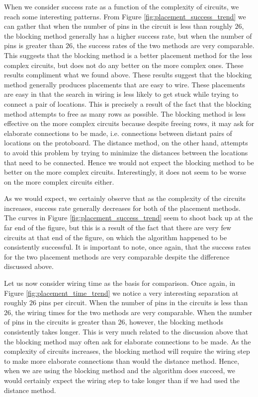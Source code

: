 When we consider success rate as a function of the complexity of circuits, we
reach some interesting patterns. From Figure \ref{fig:placement_success_trend} we
can gather that when the number of pins in the circuit is less than roughly $26$,
the blocking method generally has a higher success rate, but when the number of
pins is greater than $26$, the success rates of the two methods are very
comparable. This suggests that the blocking method is a better placement method
for the less complex circuits, but does not do any better on the more
complex ones. These results compliment what we found above. These results
suggest that the blocking method generally produces placements that are easy to
wire. These placements are easy in that the search in wiring is less likely to
get stuck while trying to connect a pair of locations. This is precisely a result
of the fact that the blocking method attempts to free as many rows as possible.
The blocking method is less effective on the more complex circuits because
despite freeing rows, it may ask for elaborate connections to be made, i.e.
connections between distant pairs of locations on the protoboard. The distance
method, on the other hand, attempts to avoid this problem by trying to minimize
the distances between the locations that need to be connected. Hence we would
not expect the blocking method to be better on the more complex circuits.
Interestingly, it does not seem to be worse on the more complex circuits either.

As we would expect, we certainly observe that as the complexity of the circuits
increases, success rate generally decreases for both of the placement methods.
The curves in Figure \ref{fig:placement_success_trend} seem to shoot back up
at the far end of the figure, but this is a result of the fact that there are
very few circuits at that end of the figure, on which the algorithm happened to
be consistently successful. It is important to note, once again, that the success
rates for the two placement methods are very comparable despite the difference
discussed above.

Let us now consider wiring time as the basis for comparison. Once again, in
Figure \ref{fig:placement_time_trend} we notice a very interesting separation
at roughly $26$ pins per circuit. When the number of pins in the circuits is
less than $26$, the wiring times for the two methods are very comparable.
When the number of pins in the circuits is greater than $26$, however, the
blocking methods consistently takes longer. This is very much related to the
discussion above that the blocking method may often ask for elaborate connections
to be made. As the complexity of circuits increases, the blocking method will
require the wiring step to make more elaborate connections than would the distance
method. Hence, when we are using the blocking method and the algorithm does succeed,
we would certainly expect the wiring step to take longer than if we had used the
distance method.

